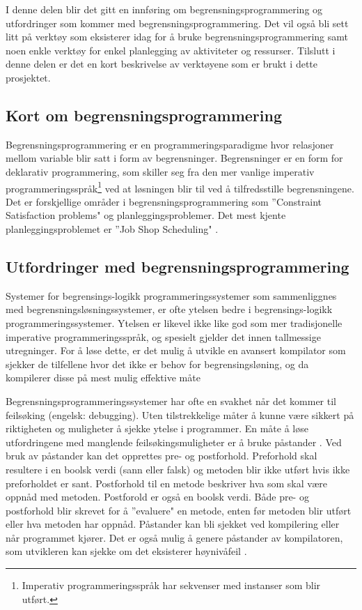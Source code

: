I denne delen blir det gitt en innføring om begrensningsprogrammering og utfordringer som kommer med begrensningsprogrammering. Det vil også bli sett litt på verktøy som eksisterer idag for å bruke begrensningsprogrammering samt noen enkle verktøy for enkel planlegging av aktiviteter og ressurser. Tilslutt i denne delen er det en kort beskrivelse av verktøyene som er brukt i dette prosjektet.

\subsection{Kort om begrensningsprogrammering}
Begrensningsprogrammering er en programmeringsparadigme hvor relasjoner mellom variable blir satt i form av begrensninger. Begrensninger er en form for deklarativ programmering, som skiller seg fra den mer vanlige imperativ programmeringsspråk\footnote{Imperativ programmeringsspråk har sekvenser med instanser som blir utført.} ved at løsningen blir til ved å tilfredsstille begrensningene. Det er forskjellige områder i begrensningsprogrammering som ''Constraint Satisfaction problems" og planleggingsproblemer. Det mest kjente planleggingsproblemet er ''Job Shop Scheduling" \cite{cpwikipedia}.

\subsection{Utfordringer med begrensningsprogrammering}
Systemer for begrensings-logikk programmeringssystemer som sammenliggnes med begrensningsløsningssystemer, er ofte ytelsen bedre i begrensings-logikk programmeringssystemer. Ytelsen er likevel ikke like god som mer tradisjonelle imperative programmeringsspråk, og spesielt gjelder det innen tallmessige utregninger. For å løse dette, er det mulig å utvikle en avansert kompilator som sjekker de tilfellene hvor det ikke er behov for begrensingsløning, og da kompilerer disse på mest mulig effektive måte \cite{challengesManuel}

Begrensningsprogrammeringssystemer har ofte en svakhet når det kommer til feilsøking (engelsk: debugging). Uten tilstrekkelige måter å kunne være sikkert på riktigheten og muligheter å sjekke ytelse i programmer. En måte å løse utfordringene med manglende feilsøkingsmuligheter er å bruke påstander . Ved bruk av påstander kan det opprettes pre- og postforhold. Preforhold skal resultere i en boolsk verdi (sann eller falsk) og metoden blir ikke utført hvis ikke preforholdet er sant. Postforhold til en metode beskriver hva som skal være oppnåd med metoden. Postforold er også en boolsk verdi. Både pre- og postforhold blir skrevet for å ''evaluere" en metode, enten før metoden blir utført eller hva metoden har oppnåd. Påstander kan bli sjekket ved kompilering eller når programmet kjører. Det er også mulig å genere påstander av kompilatoren, som utvikleren kan sjekke om det eksisterer høynivåfeil \cite{challengesManuel}.

